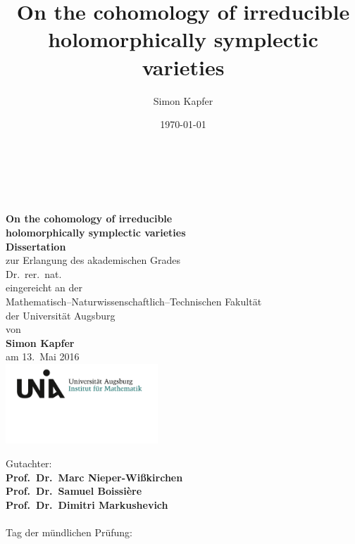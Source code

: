 \documentclass[11pt,twoside]{article}
\begin{document}
\title{
\bf On the cohomology of irreducible holomorphically symplectic varieties
}


\author{Simon Kapfer}


\date{\today}
\thispagestyle{empty}
\begin{center}
\ \\
\ \\
\ \\
\textbf{ \LARGE On the cohomology of irreducible\\holomorphically symplectic varieties}
\\
\vspace{12mm}
\Large \textbf{Dissertation} \\
\textnormal\large zur Erlangung des akademischen Grades \\
\vspace{1mm}
Dr.~rer.~nat. \\
\vspace{8mm}
eingereicht an der \\
Mathematisch--Naturwissenschaftlich--Technischen Fakult\"at\\
der Universit\"at Augsburg
\\ \vspace{6mm}
von \\
\textbf{Simon Kapfer}\\
\vspace{8mm}
am 13.~Mai 2016 \\
\vspace{15mm}
\includegraphics[height=30mm]{LogoInstitut.png}
\end{center}
\clearpage


\begin{minipage}{200pt}
\vspace{11cm}
Gutachter: \vspace{3pt}\\
\textbf{Prof.~Dr.~Marc Nieper-Wi\ss kirchen}\\
\textbf{Prof.~Dr.~Samuel Boissi\`ere} \\
\textbf{Prof.~Dr.~Dimitri Markushevich} \\
\vspace{18mm}\\
Tag der m\"undlichen Pr\"ufung:

\end{minipage}
\cleardoublepage
\end{document}
